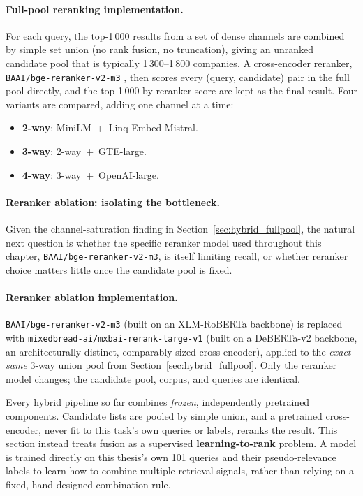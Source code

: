 \documentclass[a4paper,oneside,bibliography=totoc]{scrbook}
\begin{document}
\paragraph{Full-pool reranking implementation.} For each query, the top-1\,000 results from a set of dense channels are combined by simple set union (no rank fusion, no truncation), giving an unranked candidate pool that is typically 1\,300--1\,800 companies. A cross-encoder reranker, \texttt{BAAI/bge-reranker-v2-m3} \citep{baaireranker2024}, then scores every (query, candidate) pair in the full pool directly, and the top-1\,000 by reranker score are kept as the final result. Four variants are compared, adding one channel at a time:

\begin{itemize}
\item \textbf{2-way}: MiniLM~+~Linq-Embed-Mistral.
\item \textbf{3-way}: 2-way~+~GTE-large.
\item \textbf{4-way}: 3-way~+~OpenAI-large.
\end{itemize}

\paragraph{Reranker ablation: isolating the bottleneck.}
\label{sec:reranker_ablation}

Given the channel-saturation finding in Section~\ref{sec:hybrid_fullpool}, the natural next question is whether the specific reranker model used throughout this chapter, \texttt{BAAI/bge-reranker-v2-m3}, is itself limiting recall, or whether reranker choice matters little once the candidate pool is fixed.

\paragraph{Reranker ablation implementation.} \texttt{BAAI/bge-reranker-v2-m3} (built on an XLM-RoBERTa backbone) is replaced with \texttt{mixedbread-ai/mxbai-rerank-large-v1} \citep{mixedbread2024mxbai} (built on a DeBERTa-v2 backbone, an architecturally distinct, comparably-sized cross-encoder), applied to the \emph{exact same} 3-way union pool from Section~\ref{sec:hybrid_fullpool}. Only the reranker model changes; the candidate pool, corpus, and queries are identical.

\label{sec:learned_fusion}

Every hybrid pipeline so far combines \emph{frozen}, independently pretrained components. Candidate lists are pooled by simple union, and a pretrained cross-encoder, never fit to this task's own queries or labels, reranks the result. This section instead treats fusion as a supervised \textbf{learning-to-rank} problem. A model is trained directly on this thesis's own 101 queries and their pseudo-relevance labels to learn how to combine multiple retrieval signals, rather than relying on a fixed, hand-designed combination rule.
\end{document}
